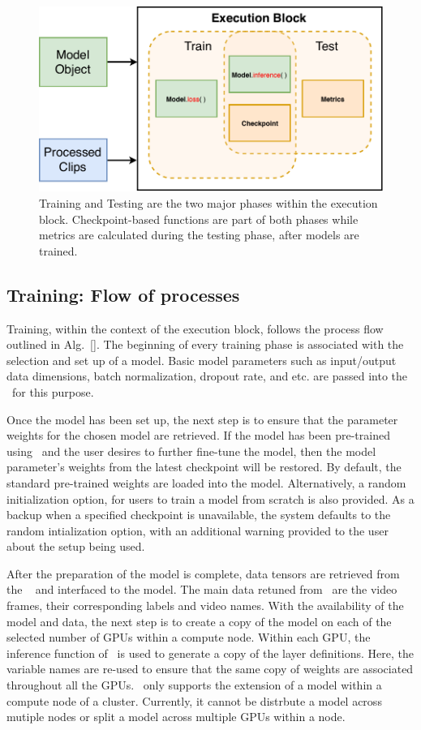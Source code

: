 \documentclass{llncs}
\begin{document}
\begin{figure}[t!]
\centering
\includegraphics[width=0.8\columnwidth]{images/exec_block.pdf}
\caption{Training and Testing are the two major phases within the execution block. Checkpoint-based functions are part of both phases while metrics are calculated during the testing phase, after models are trained.}
\label{fig:exec_block}
\end{figure}

\subsection{Training: Flow of processes}
\label{sec:training}
Training, within the context of the execution block, follows the process flow outlined in Alg.~\ref{}.
The beginning of every training phase is associated with the selection and set up of a model.
Basic model parameters such as input/output data dimensions, batch normalization, dropout rate, and etc. are passed into the \model~for this purpose.

Once the model has been set up, the next step is to ensure that the parameter weights for the chosen model are retrieved.
If the model has been pre-trained using \acro~and the user desires to further fine-tune the model, then the model parameter's weights from the latest checkpoint will be restored.
By default, the standard pre-trained weights are loaded into the model.
Alternatively, a random initialization option, for users to train a model from scratch is also provided.
As a backup when a specified checkpoint is unavailable, the system defaults to the random intialization option, with an additional warning provided to the user about the setup being used.

After the preparation of the model is complete, data tensors are retrieved from the \data~ and interfaced to the model.
The main data retuned from \data~are the video frames, their corresponding labels and video names.
With the availability of the model and data, the next step is to create a copy of the model on each of the selected number of GPUs within a compute node.
Within each GPU, the inference function of \model~is used to generate a copy of the layer definitions.
Here, the variable names are re-used to ensure that the same copy of weights are associated throughout all the GPUs.
\acro~only supports the extension of a model within a compute node of a cluster.
Currently, it cannot be distrbute a model across mutiple nodes or split a model across multiple GPUs within a node.
\end{document}
